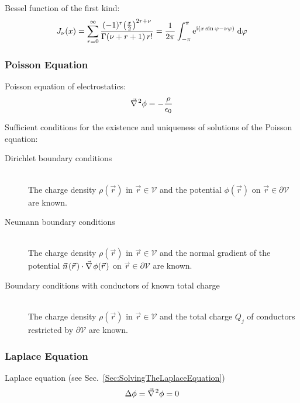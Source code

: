 			\noindent
			Bessel function of the first kind:
			\begin{equation}
				J_\nu(x) = \sum_{r=0}^\infty \frac{(-1)^r\qty(\frac{x}{2})^{2r+\nu}}{\Gamma(\nu+r+1)\,r!} = \frac{1}{2\pi}\int_{-\pi}^{\pi} \mathrm{e}^{\mathrm{i}(x\sin\varphi-\nu\varphi)}\;\dd\varphi
			\end{equation}

		\subsubsection{Poisson Equation}
			\noindent
			Poisson equation of electrostatics:
			\begin{equation}
				\Nabla^2\phi = -\frac{\rho}{\epsilon_0}
			\end{equation}

			\noindent
			Sufficient conditions for the existence and uniqueness of solutions of the Poisson equation:
			\begin{description}
				\item[Dirichlet boundary conditions]\hfill \\
					The charge density $\rho(\vec{r})$ in $\vec{r}\in\mathcal{V}$ and the potential $\phi(\vec{r})$ on $\vec{r}\in\partial\mathcal{V}$ are known.
				\item[Neumann boundary conditions]\hfill \\
					The charge density  $\rho(\vec{r})$ in $\vec{r}\in\mathcal{V}$ and the normal gradient of the potential  $\vec{n}(\vec{r})\cdot\Nabla\phi(\vec{r})$ on $\vec{r}\in\partial\mathcal{V}$ are known.
				\item[Boundary conditions with conductors of known total charge]\hfill \\
					The charge density $\rho(\vec{r})$ in $\vec{r}\in\mathcal{V}$ and the total charge $Q_j$ of conductors restricted by $\partial\mathcal{V}$ are known.
			\end{description}

		\subsubsection{Laplace Equation}
			\noindent
			Laplace equation (see Sec.~\ref{Sec:SolvingTheLaplaceEquation})
			\begin{equation}
				\Delta\phi=\Nabla^2\phi = 0
			\end{equation}

